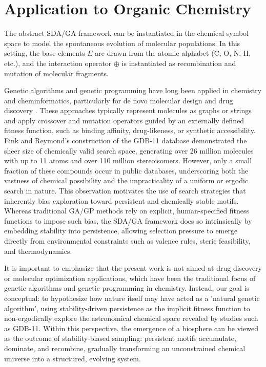 \documentclass{artificial-life}
\let\cite\citep
\begin{document}
\section{Application to Organic Chemistry}
\label{sec:chemistry}

The abstract SDA/GA framework can be instantiated in the chemical symbol space to model
the spontaneous evolution of molecular populations. In this setting, the base elements
$E$ are drawn from the atomic alphabet (C, O, N, H, etc.), and the interaction operator
$\oplus$ is instantiated as recombination and mutation of molecular fragments. 

Genetic algorithms and genetic programming have long been applied in chemistry and 
cheminformatics, particularly for de novo molecular design and drug discovery 
\cite{brown2004ga,jensen2019ga,yoshikawa2018ga}. These approaches typically 
represent molecules as graphs or strings and apply crossover and mutation operators 
guided by an externally defined fitness function, such as binding affinity, 
drug-likeness, or synthetic accessibility. Fink and Reymond’s construction of the
GDB-11 database \cite{fink2007gdb11} demonstrated the sheer size of chemically valid
search space, generating over 26 million molecules with up to 11 atoms and over
110 million stereoisomers. However, only a small fraction of these compounds occur in
public databases, underscoring both the vastness of chemical possibility and the impracticality of a uniform or ergodic search in nature. This observation motivates the use of
search strategies that inherently bias exploration toward persistent and chemically
stable motifs. Whereas traditional GA/GP methods rely on explicit, human-specified 
fitness functions to impose such bias, the SDA/GA framework does so intrinsically by
embedding stability into persistence, allowing selection pressure to emerge directly
from environmental constraints such as valence rules, steric feasibility, and
thermodynamics.

It is important to emphasize that the present work is not aimed at drug discovery
or molecular optimization applications, which have been the traditional focus of
genetic algorithms and genetic programming in chemistry. Instead, our goal is
conceptual: to hypothesize how nature itself may have acted as a 'natural genetic algorithm', using stability-driven persistence as the implicit fitness function to
non-ergodically explore the astronomical chemical space revealed by studies such
as GDB-11. Within this perspective, the emergence of a biosphere can be viewed as
the outcome of stability-biased sampling: persistent motifs accumulate, dominate, 
and recombine, gradually transforming an unconstrained chemical universe into a
structured, evolving system.
\end{document}
